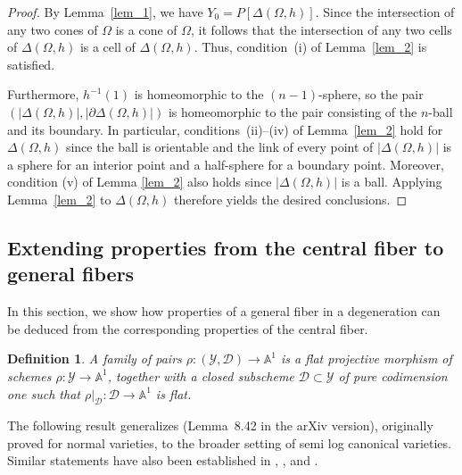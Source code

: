 \documentclass[12pt,letterpaper, reqno]{amsart}
\theoremstyle{defstyle} \newtheorem{definition}[theorem]{Definition}
\theoremstyle{remark}
\numberwithin{equation}{section}
\numberwithin{figure}{section}
\newcommand{\A} {\mathbb{A}}
\newcommand{\cY} {\mathcal{Y}}
\newcommand{\cD} {\mathcal{D}}
\begin{document}
\begin{proof}
By Lemma~\ref{lem_1}, we have \(Y_0=P[\Delta(\Omega,h)]\). Since the intersection of any two cones of \(\Omega\) is a cone of \(\Omega\), it follows that the intersection of any two cells of \(\Delta(\Omega,h)\) is a cell of \(\Delta(\Omega,h)\). Thus, condition~(i) of Lemma~\ref{lem_2} is satisfied.

Furthermore, \(h^{-1}(1)\) is homeomorphic to the \((n-1)\)-sphere, so the pair \((|\Delta(\Omega,h)|,|\partial\Delta(\Omega,h)|)\) is homeomorphic to the pair consisting of the \(n\)-ball and its boundary. In particular, conditions~(ii)--(iv) of Lemma~\ref{lem_2} hold for \(\Delta(\Omega,h)\) 
since the ball is orientable and the link of every point of $|\Delta(\Omega, h)|$ is a sphere for an interior point and a half-sphere for a boundary point.
Moreover, condition (v) of Lemma \ref{lem_2} also holds since $|\Delta(\Omega,h)|$ is a ball. 
Applying Lemma~\ref{lem_2} to $\Delta(\Omega,h)$ therefore yields the desired conclusions.
\end{proof}

\subsection{Extending properties from the central fiber to general fibers}
\label{section_extending}

In this section, we show how properties of a general fiber in a degeneration can be deduced from the corresponding properties of the central fiber.


\begin{definition}
A \emph{family of pairs} $\rho: (\cY , \cD) \rightarrow \A^1$ is a flat projective morphism of schemes $\rho: \cY \rightarrow \A^1$, together with a closed subscheme $\cD \subset \cY$ of pure codimension one such that $\rho|_\cD: \cD \rightarrow \A^1$ is flat.
\end{definition}


The following result generalizes \cite[Lemma~8.33]{GHKK} (Lemma~8.42 in the arXiv version), originally proved for normal varieties, to the broader setting of semi log canonical varieties. Similar statements have also been established in \cite[Proposition~7.1]{HKY20}, \cite[Theorem~6.36]{AAB2024ksba}, and \cite[Theorem~17.5]{keel2024log}.
\end{document}
